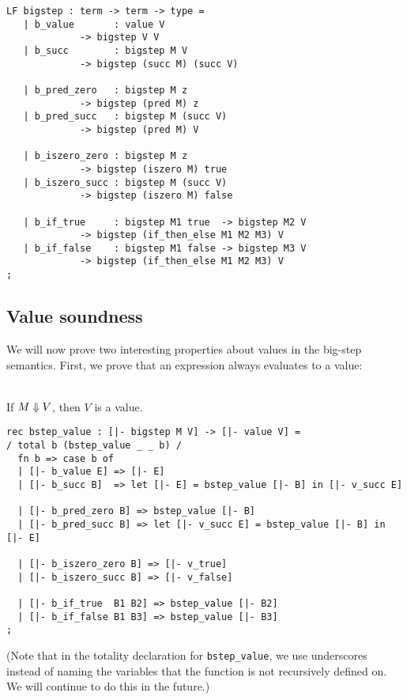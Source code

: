 \begin{lstlisting}
LF bigstep : term -> term -> type =
   | b_value       : value V
		     -> bigstep V V
   | b_succ        : bigstep M V
		     -> bigstep (succ M) (succ V)

   | b_pred_zero   : bigstep M z
		     -> bigstep (pred M) z
   | b_pred_succ   : bigstep M (succ V)
		     -> bigstep (pred M) V

   | b_iszero_zero : bigstep M z
		     -> bigstep (iszero M) true
   | b_iszero_succ : bigstep M (succ V)
		     -> bigstep (iszero M) false

   | b_if_true     : bigstep M1 true  -> bigstep M2 V
		     -> bigstep (if_then_else M1 M2 M3) V
   | b_if_false    : bigstep M1 false -> bigstep M3 V
		     -> bigstep (if_then_else M1 M2 M3) V
;
\end{lstlisting}

\subsection{Value soundness}

We will now prove two interesting properties about values in the big-step semantics.
First, we prove that an expression always evaluates to a value:

\begin{lemma}
  \label{lem:bstep-value-soundness}
  ~\\If $M \Downarrow V$, then $V$ is a value.
\end{lemma}

\begin{lstlisting}
rec bstep_value : [|- bigstep M V] -> [|- value V] =
/ total b (bstep_value _ _ b) /
  fn b => case b of
  | [|- b_value E] => [|- E]
  | [|- b_succ B]  => let [|- E] = bstep_value [|- B] in [|- v_succ E]

  | [|- b_pred_zero B] => bstep_value [|- B]
  | [|- b_pred_succ B] => let [|- v_succ E] = bstep_value [|- B] in [|- E]

  | [|- b_iszero_zero B] => [|- v_true]
  | [|- b_iszero_succ B] => [|- v_false]

  | [|- b_if_true  B1 B2] => bstep_value [|- B2]
  | [|- b_if_false B1 B3] => bstep_value [|- B3]
;
\end{lstlisting}

(Note that in the totality declaration for \lstinline!bstep_value!, we
use underscores instead of naming the variables that the function
is not recursively defined on. We will continue to do this in the
future.)

